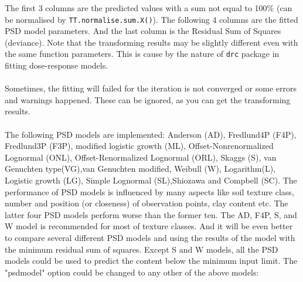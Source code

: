 \documentclass[a4paper]{article}
\begin{document}
The first 3 columns are the predicted values with a sum not equal to
100\% (can be normalised by \texttt{TT.normalise.sum.X()}). The
following 4 columns are the fitted PSD model parameters. And the
last column is the Residual Sum of Squares (deviance). Note that the transforming 
results may be slightly different even with the same function parameters. 
This is cause by the nature of \texttt{drc} package in fitting dose-response models.\\\\

Sometimes, the fitting will failed for the iteration is not converged
or some errors and warnings happened. These can be ignored, as you
can get the transforming results.\\\\

The following PSD models are implemented: Anderson (AD), Fredlund4P
(F4P), Fredlund3P (F3P), modified logistic growth (ML),
Offset-Nonrenormalized Lognormal (ONL), Offset-Renormalized
Lognormal (ORL), Skaggs (S), van Genuchten type(VG),van Genuchten
modified, Weibull (W), Logarithm(L),  Logistic growth (LG),
Simple Lognormal (SL),Shiozawa and Compbell (SC). The performance of
PSD models is influenced by many aspects like soil texture class,
number and position (or closeness) of observation points, clay
content etc. The latter four PSD models perform worse than the
former ten. The AD, F4P, S, and W model is recommended for most of
texture classes. And it will be even better to compare several
different PSD models and using the results of the model with the
minimum residual sum of squares. Except S and W models, all the PSD
models could be used to predict the content below the minimum input
limit. The "psdmodel" option could be changed to any other of the
above models:
\end{document}
